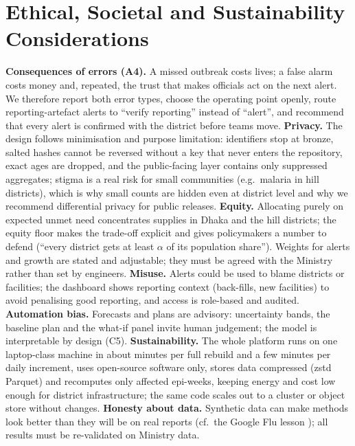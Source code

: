 \documentclass[conference]{IEEEtran}
\begin{document}
\section{Ethical, Societal and Sustainability Considerations}\label{sec:ethics}
\textbf{Consequences of errors (A4).} A missed outbreak costs lives; a false alarm costs money and, repeated, the
trust that makes officials act on the next alert. We therefore report both error types, choose the operating
point openly, route reporting-artefact alerts to ``verify reporting'' instead of ``alert'', and recommend that
every alert is confirmed with the district before teams move. \textbf{Privacy.} The design follows
minimisation and purpose limitation: identifiers stop at bronze, salted hashes cannot be reversed without a key
that never enters the repository, exact ages are dropped, and the public-facing layer contains only suppressed
aggregates; stigma is a real risk for small communities (e.g.\ malaria in hill districts), which is why small
counts are hidden even at district level and why we recommend differential privacy for public releases.
\textbf{Equity.} Allocating purely on expected unmet need concentrates supplies in Dhaka and the hill districts;
the equity floor makes the trade-off explicit and gives policymakers a number to defend (``every district gets at
least $\alpha$ of its population share''). Weights for alerts and growth are stated and adjustable; they must be
agreed with the Ministry rather than set by engineers. \textbf{Misuse.} Alerts could be used to blame districts or
facilities; the dashboard shows reporting context (back-fills, new facilities) to avoid penalising good reporting,
and access is role-based and audited. \textbf{Automation bias.} Forecasts and plans are advisory: uncertainty
bands, the baseline plan and the what-if panel invite human judgement; the model is interpretable by design (C5).
\textbf{Sustainability.} The whole platform runs on one laptop-class machine in about \DagMinutes{} minutes per
full rebuild and a few minutes per daily increment, uses open-source software only, stores data compressed
(zstd Parquet) and recomputes only affected epi-weeks, keeping energy and cost low enough for district
infrastructure; the same code scales out to a cluster or object store without changes.
\textbf{Honesty about data.} Synthetic data can make methods look better than they will be on real reports
(cf.\ the Google Flu lesson \cite{lazer2014}); all results must be re-validated on Ministry data.
\end{document}
